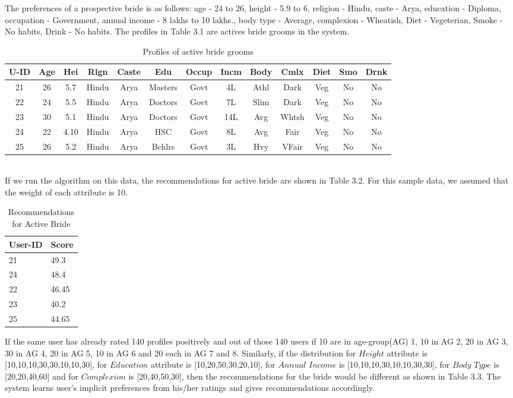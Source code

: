 \documentclass[12pt,oneside]{book}
\begin{document}
The preferences of a prospective bride is as follows:  age - 24 to 26, height - 5.9 to 6,    religion - Hindu, caste - Arya, education - Diploma,  occupation - Government, annual income - 8 lakhs  to 10 lakhs., body type - Average, complexion - Wheatish, Diet - Vegeterian, Smoke - No habits, Drink - No habits. The profiles in Table 3.1 are actives bride grooms in the system.
\begin{table}[h!]
\caption{Profiles of active bride grooms}
\vspace{0.1in}
 \begin{tabular}{|c|c|c|c|c|c|c|c|c|c|c|c|c|}
 \hline
 U-ID & Age & Hei & Rlgn & Caste & Edu & Occup & Incm & Body & Cmlx & Diet & Smo & Drnk\\
 \hline
 21 & 26 & 5.7 & Hindu & Arya  & Masters & Govt & 4L & Athl & Dark & Veg & No & No\\
 \hline
 22 & 24 & 5.5 & Hindu & Arya  & Doctors & Govt & 7L & Slim & Dark & Veg & No & No\\
 \hline
 23 & 30 & 5.1 & Hindu & Arya  & Doctors & Govt & 14L & Avg & Whtsh & Veg & No & No\\
 \hline
 24 & 22 & 4.10 & Hindu & Arya & HSC & Govt & 8L & Avg & Fair & Veg & No & No\\
 \hline
 25 & 26 & 5.2 & Hindu & Arya  & Bchlrs & Govt & 3L & Hvy & VFair & Veg & No & No\\
 \hline
\end{tabular}
\end{table}\\
If we run the algorithm on this data, the recommendations for active bride are shown in Table 3.2. For this sample data, we assumed that the weight of each attribute is 10.

\begin{table}[h!]
\centering
\caption{Recommendations for Active Bride}
\vspace{0.1in}
 \begin{tabular}{|m{3cm}|m{2em}|}
 \hline
 User-ID & Score\\
\hline
21 & 49.3\\
\hline
24 & 48.4\\
\hline
22& 46.45 \\
\hline
23 & 40.2 \\
\hline
25 & 44.65 \\
\hline
\end{tabular}
\end{table}

If the same user has already rated 140 profiles positively and out of those 140 users if 10 are in age-group(AG) 1, 10 in AG 2, 20 in AG 3, 30 in AG 4, 20 in AG 5, 10 in AG 6 and 20 each in AG 7 and 8. Similarly, if the distribution for $Height$ attribute is [10,10,10,30,30,10,10,30], for $Education$ attribute is [10,20,50,30,20,10], for $Annual$ $Income$ is [10,10,10,30,10,10,30,30], for $Body$ $Type$ is [20,20,40,60] and for $Complexion$ is [20,40,50,30], then the recommendations for the bride would be different as shown in Table 3.3. The system learns user's implicit preferences from his/her ratings and gives recommendations accordingly. 
\end{document}
